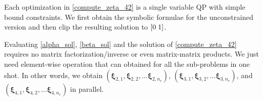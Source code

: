 Each optimization in \eqref{compute_zeta_42} is a single variable QP with simple bound constraints. We first obtain the symbolic formulae for the unconstrained version and then clip the resulting solution to $[0 \hspace{0.1cm} 1 ] $.

\begin{remark}\label{matrix_inversion_free_solution}
Evaluating \eqref{alpha_sol}, \eqref{beta_sol} and the solution of \ref{compute_zeta_42} requires no matrix factorization/inverse or even matrix-matrix products. We just need element-wise operation that can obtained for all the sub-problems in one shot. In other words, we obtain $(\boldsymbol{\xi}_{2, 1}, \boldsymbol{\xi}_{2, 2}, \dots \boldsymbol{\xi}_{2, n_r})$, $(\boldsymbol{\xi}_{3, 1}, \boldsymbol{\xi}_{3, 2}, \dots \boldsymbol{\xi}_{3, n_r})$, and $(\boldsymbol{\xi}_{4, 1}, \boldsymbol{\xi}_{4, 2}, \dots \boldsymbol{\xi}_{4, n_r})$ in parallel.

\end{remark}








